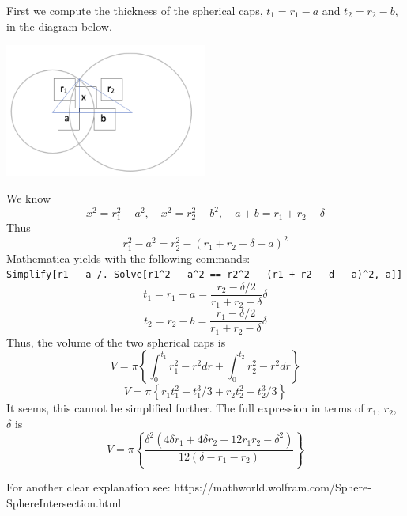\documentclass[fontsize=12pt, paper=a4]{report}
\begin{document}
First we compute the thickness of the spherical caps, $t_1 = r_1-a$ and $t_2 = r_2-b$, in the diagram below.
\begin{center}
\includegraphics[width=0.5\textwidth]{Schematic}
\end{center}
We know
\[ x^2 = r_1^2 - a^2,\quad x^2 = r_2^2 - b^2,\quad a+b = r_1+r_2-\delta \]
Thus
\[ r_1^2 - a^2 = r_2^2 - (r_1+r_2-\delta-a)^2 \]
Mathematica yields with the following commands:\\
\verb$Simplify[r1 - a /. Solve[r1^2 - a^2 == r2^2 - (r1 + r2 - d - a)^2, a]]$
\begin{equation} 
t_1 = r_1-a = \frac{r_2-\delta/2}{r_1+r_2-\delta}\delta
\end{equation}
\begin{equation} t_2 = r_2-b = \frac{r_1-\delta/2}{r_1+r_2-\delta}\delta
\end{equation}
Thus, the volume of the two spherical caps is
\[V = \pi \left\{\int_0^{t_1} r_1^2-r^2 dr + \int_0^{t_2} r_2^2-r^2 dr\right\}\]
\begin{equation}
V = \pi \left\{r_1t_1^2-t_1^3/3 + r_2t_2^2-t_2^3/3\right\}
\end{equation}
It seems, this cannot be simplified further. The full expression in terms of $r_1$, $r_2$, $\delta$ is 
\[V = \pi \left\{\frac{\delta^2 (4 \delta r_1 + 4 \delta r_2 - 12r_1r_2 - \delta^2)}{12 (\delta-r_1-r_2)}\right\}\]

For another clear explanation see: https://mathworld.wolfram.com/Sphere-SphereIntersection.html
\end{document}

